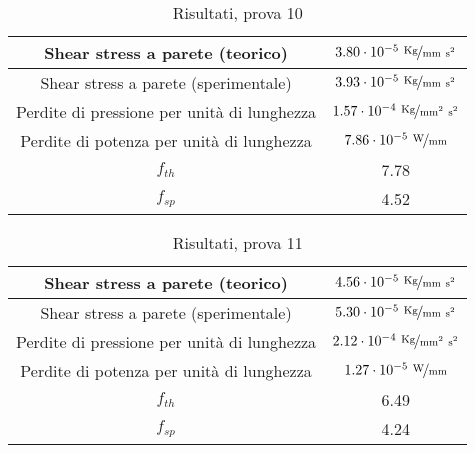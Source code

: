 \documentclass{article} %
\begin{document}
\begin{table}[ht!]
	\centering
	\setlength \extrarowheight{3pt}
	\begin{tabular}{|c|c|}
		\hline
		Shear stress a parete (teorico) & $3.80 \cdot 10^{-5}\ \nicefrac{\rm Kg}{\rm mm\ s^2}$ \\ 
		\hline 
		Shear stress a parete (sperimentale) & $3.93 \cdot 10^{-5}\ \nicefrac{\rm Kg}{\rm mm\ s^2}$ \\ 
		\hline 
		Perdite di pressione per unità di lunghezza & $1.57 \cdot 10^{-4}\ \nicefrac{\rm Kg}{\rm mm^2\ s^2}$ \\ %
		\hline 
		Perdite di potenza per unità di lunghezza & $7.86 \cdot 10^{-5}\ \nicefrac{\rm W}{\rm mm}$ \\ 
		\hline 
		$f_{th}$ & 7.78 \\ 
		\hline 
		$f_{sp}$ & 4.52 \\ 
		\hline 
	\end{tabular}
	\caption{Risultati, prova 10}
	\label{tab:A10}
\end{table}
\begin{table}[ht!]
\centering
\setlength \extrarowheight{3pt}
\begin{tabular}{|c|c|}
	\hline
	Shear stress a parete (teorico) & $4.56 \cdot 10^{-5}\ \nicefrac{\rm Kg}{\rm mm\ s^2}$ \\ 
	\hline 
	Shear stress a parete (sperimentale) & $5.30 \cdot 10^{-5}\ \nicefrac{\rm Kg}{\rm mm\ s^2}$ \\ 
	\hline 
	Perdite di pressione per unità di lunghezza & $2.12 \cdot 10^{-4}\ \nicefrac{\rm Kg}{\rm mm^2\ s^2}$ \\ %
	\hline 
	Perdite di potenza per unità di lunghezza & $1.27 \cdot 10^{-5}\ \nicefrac{\rm W}{\rm mm}$ \\ 
	\hline 
	$f_{th}$ & 6.49 \\ 
	\hline 
	$f_{sp}$ & 4.24 \\ 
	\hline 
\end{tabular}
\caption{Risultati, prova 11}
\label{tab:A11}
\end{table}
\end{document}
